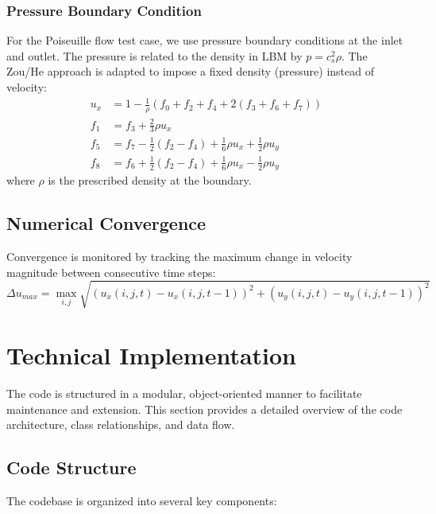 \documentclass[12pt,a4paper]{article}
\begin{document}
\subsubsection{Pressure Boundary Condition}
For the Poiseuille flow test case, we use pressure boundary conditions at the inlet and outlet. The pressure is related to the density in LBM by $p = c_s^2 \rho$. The Zou/He approach is adapted to impose a fixed density (pressure) instead of velocity:
\begin{align}
u_x &= 1 - \frac{1}{\rho}(f_0 + f_2 + f_4 + 2(f_3 + f_6 + f_7))\\
f_1 &= f_3 + \frac{2}{3}\rho u_x\\
f_5 &= f_7 - \frac{1}{2}(f_2 - f_4) + \frac{1}{6}\rho u_x + \frac{1}{2}\rho u_y\\
f_8 &= f_6 + \frac{1}{2}(f_2 - f_4) + \frac{1}{6}\rho u_x - \frac{1}{2}\rho u_y
\end{align}
where $\rho$ is the prescribed density at the boundary.

\subsection{Numerical Convergence}
Convergence is monitored by tracking the maximum change in velocity magnitude between consecutive time steps:
\begin{equation}
\Delta u_{max} = \max_{i,j} \sqrt{(u_x(i,j,t) - u_x(i,j,t-1))^2 + (u_y(i,j,t) - u_y(i,j,t-1))^2}
\end{equation}

\section{Technical Implementation}
The code is structured in a modular, object-oriented manner to facilitate maintenance and extension. This section provides a detailed overview of the code architecture, class relationships, and data flow.

\subsection{Code Structure}
The codebase is organized into several key components:
\end{document}
